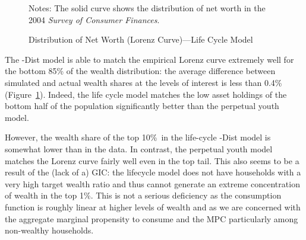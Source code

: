 \documentclass[12pt,titlepage]{econtex}
\begin{document}
\begin{figure}
\caption{Distribution of Net Worth (Lorenz Curve)---Life Cycle Model}
\label{LorenzLifecycle}
\footnotesize Notes: The solid curve shows the distribution of net worth in the 2004 \emph{Survey of Consumer Finances}.
\end{figure}

The \Discount-Dist model is able to match the empirical Lorenz curve extremely well for the bottom 85\% of the wealth distribution: the average difference between simulated and actual wealth shares at the levels of interest is less than 0.4\% (Figure~\ref{LorenzLifecycle}).  Indeed, the life cycle model matches the low asset holdings of the bottom half of the population significantly better than the perpetual youth model.

However, the wealth share of the top 10\%\ in the life-cycle \Discount-Dist model is somewhat lower than in the data. In contrast, the perpetual youth model matches the Lorenz curve fairly well even in the top tail.  This also seems to be a result of the (lack of a) GIC: the lifecycle model does not have households with a very high target wealth ratio and thus cannot generate an extreme concentration of wealth in the top 1\%.  This is not a serious deficiency as the consumption function is roughly linear at higher levels of wealth and as we are concerned with the aggregate marginal propensity to consume and the MPC particularly among non-wealthy households.
\end{document}
